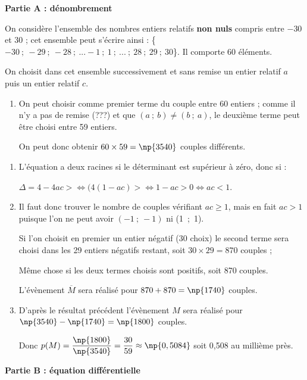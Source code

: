 \medskip

\textbf{Partie A : dénombrement}

On considère l'ensemble des nombres entiers relatifs \textbf{non nuls} compris entre $- 30$ et $30$ ; cet ensemble peut s'écrire ainsi : \{$- 30~;~- 29~;~- 28~;~ ... - 1~;~1~;~ ... ~;~ 28~;~29~;~30$\}. Il comporte 60 éléments.

On choisit dans cet ensemble successivement et sans remise un entier relatif $a$ puis un entier relatif $c$.

\medskip

\begin{enumerate}
\item 
On peut choisir comme premier terme du couple entre 60 entiers ;  comme il n'y a pas de remise (???) et que $(a~;~b) \ne (b~;~a)$, le deuxième terme peut être choisi entre 59 entiers.

On peut donc obtenir $60 \times 59 = \np{3540}$ couples différents.
\end{enumerate}



\begin{enumerate}[resume]
\item 
L'équation a deux racines si  le déterminant est supérieur à zéro, donc si :

$\Delta = 4 - 4ac >  \iff (4(1 - ac) > \iff 1 - ac > 0 \iff ac < 1$.
\item 
Il faut donc trouver le nombre de couples vérifiant $ac \geqslant 1$, mais en fait $ac > 1$ puisque l'on ne peut avoir $(-1~;~-1)$ ni (1~;~1).

Si l'on choisit en premier un entier négatif (30 choix) le second terme sera choisi dans les 29 entiers négatifs restant, soit $30 \times 29 = 870$ couples ;

Même chose si les deux termes choisis sont positifs, soit 870 couples.

L'évènement $\overline{M}$ sera réalisé pour $870 + 870 = \np{1740}$ couples.
\item 
D'après le résultat précédent l'évènement $M$ sera réalisé pour $\np{3540} - \np{1740} = \np{1800}$ couples.

Donc $p(M) = \dfrac{\np{1800}}{\np{3540}} = \dfrac{30}{59} \approx \np{0,5084}$ soit 0,508 au millième près.
\end{enumerate}

\medskip

\textbf{Partie B : équation différentielle}

\medskip

